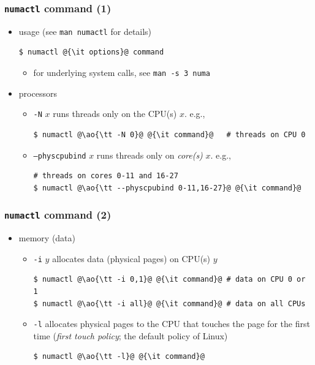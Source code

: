 \documentclass[12pt,dvipdfmx]{beamer}
\newcommand{\ao}[1]{{\color{blue}#1}}
\begin{document}
\begin{frame}[fragile]
\frametitle{{\tt numactl} command (1)}
\begin{itemize}
\item usage (see {\tt man numactl} for details)
\begin{lstlisting}
$ numactl @{\it options}@ command    
\end{lstlisting} %
\begin{itemize}
\item for underlying system calls, see {\tt man -s 3 numa}
\end{itemize}

\item processors
  \begin{itemize}
\item {\tt -N} $x$ runs threads only on the CPU(s) $x$. e.g.,
\begin{lstlisting}
$ numactl @\ao{\tt -N 0}@ @{\it command}@   # threads on CPU 0
\end{lstlisting} %
\item {\tt --physcpubind} $x$ runs threads only on {\it core(s)} $x$. e.g.,
\begin{lstlisting}
# threads on cores 0-11 and 16-27    
$ numactl @\ao{\tt --physcpubind 0-11,16-27}@ @{\it command}@
\end{lstlisting} %
\end{itemize}
\end{itemize}
\end{frame}

\begin{frame}[fragile]
\frametitle{{\tt numactl} command (2)}
\begin{itemize}
\item memory (data)
  \begin{itemize}
  \item {\tt -i} $y$ allocates data (physical pages) on CPU(s) $y$
\begin{lstlisting}
$ numactl @\ao{\tt -i 0,1}@ @{\it command}@ # data on CPU 0 or 1
$ numactl @\ao{\tt -i all}@ @{\it command}@ # data on all CPUs
\end{lstlisting} %
\item {\tt -l} allocates physical pages to the
  CPU that touches the page for the first time
  (\ao{\it first touch policy}; the default policy of Linux)
\begin{lstlisting}
$ numactl @\ao{\tt -l}@ @{\it command}@
\end{lstlisting} %
\end{itemize}
\end{itemize}
\end{frame}
\end{document}
